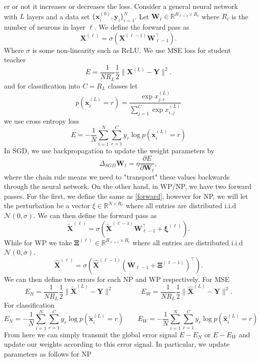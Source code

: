 \documentclass{article}
\def\R{\mathbb{R}}
\def\*#1{\mathbf{#1}}
\begin{document}
er or not it increases or decreases
the loss. Consider a general neural network with $L$ layers and a data set $\{\*x_i^{(0)},\*y_i\}_{i=1}^N$. 
Let $\*W_{\ell} \in \R^{R_{\ell+1} \times R_{\ell}}$ where $R_\ell$ is the number of 
neurons in layer $\ell$. We define the forward pass as
\begin{equation}\label{forward}\*X^{(\ell)} = \sigma\left( \*X^{(\ell-1)}\*W_{\ell-1}^\top\right).\end{equation}
Where $\sigma$ is some non-linearity such as ReLU. We use MSE loss for student teacher
\begin{equation}
\label{mseloss}
E = \frac{1}{NR_L}\frac 12 \| \*X^{(L)}- \*Y\|^2.
\end{equation}
and for classification into $C = R_L$ classes let 
\begin{equation}
\label{crossentropy}
p(\*x_i^{(L)} = r) = \frac{\exp x_{j,r}^{(L)}}{\sum_{j=1}^C \exp x_{i,j}^{(L)}}
\end{equation}
we use cross entropy loss
\[E = -\frac 1N \sum_{i=1}^N \sum_{r=1}^C y_r \log p(\*x_i^{(L)} = r) \]
In SGD, we use backpropagation to update the weight parameters by 
\[\Delta_{SGD} \* W_{\ell} = \eta\frac{\partial E}{\partial \*W_{\ell}},\] 
where the chain rule means we 
need to "transport" these values backwards through the neural network. On the other 
hand, in WP/NP, we have two forward passes. For the first, we define the same as \ref{forward}, 
however for NP, we will let the perturbation be a vector $\xi \in \R^{N\times R_{\ell}}$ where all entries are distributed 
i.i.d $\mathcal{N}(0,\sigma)$. We can then define the forward pass as 
\[ \widetilde{\*X}^{(\ell)} = \sigma\left(\widetilde{\*X}^{(\ell-1)}\*W_{\ell -1}^\top + \*\xi^{(\ell)} \right).\]
While for WP we take $\*\Xi^{(\ell)} \in \R^{R_{\ell + 1 }\times R_\ell}$ where all entries are distributed 
i.i.d $\mathcal{N}(0,\sigma)$. 
\[ \hat{\*X}^{(\ell)} = \sigma\left( \hat{\*X}^{(\ell-1)}\left(\*W_{\ell -1} + \*\Xi^{(\ell-1)}\right)^\top  \right).\]
We can then define two errors for each NP and WP respectively. For MSE
\[ E_N = \frac{1}{NR_L} \frac 12 \| \widetilde{\* X}^{(L)} - \* Y \|^2 \qquad\qquad E_W = \frac{1}{NR_L} \frac 12 \| \hat{\* X}^{(L)} - \* Y \|^2. \]
For classification
\[E_N  =  -\frac 1N \sum_{i=1}^N \sum_{r=1}^C y_r \log p(\widetilde{\*x}_i^{(L)} = r) \qquad E_W =  -\frac 1N \sum_{i=1}^N \sum_{r=1}^C y_r \log p(\hat{\*x}_i^{(L)} = r)\]
From here we can simply transmit the global error signal $E-E_N$ or $E-E_W$ and update our weights according
to this error signal. In particular, we update parameters as follows for NP
\end{document}
